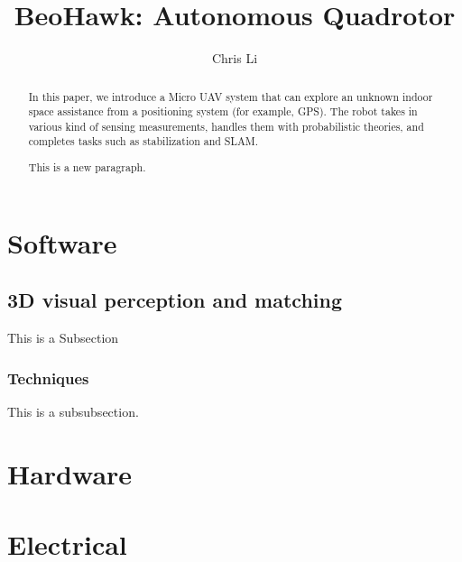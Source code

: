 \documentclass[12pt, letterpaper]{article}
\title{BeoHawk: Autonomous Quadrotor}
\author{Chris Li}
\begin{document}
\maketitle

\begin{abstract}
	In this paper, we introduce a Micro UAV system that can explore an unknown indoor space assistance from a positioning system (for example, GPS). The robot takes in various kind of sensing measurements, handles them with probabilistic theories, and completes tasks such as stabilization and SLAM.
	
	This is a new paragraph.
\end{abstract}
	
\section{Software}
	\subsection{3D visual perception and matching}
	This is a Subsection
	\subsubsection{Techniques}
	This is a subsubsection.
\section{Hardware}

\section{Electrical}
\end{document}
